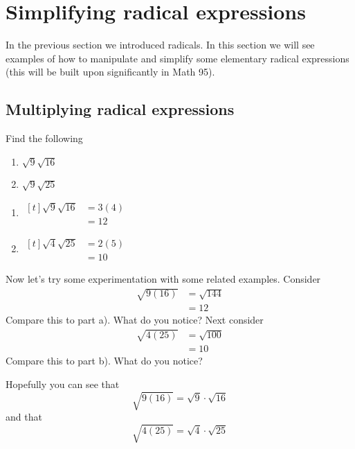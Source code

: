 \section{Simplifying radical expressions}
%
In the previous section we introduced radicals. In this section we will see examples of how to manipulate and
simplify some elementary radical expressions (this will be built upon significantly in Math 95). 

\subsection{Multiplying radical expressions}
\begin{myexample}
Find the following 
\begin{multicols}{2}
	\begin{enumerate}
		\item $\sqrt{9}\sqrt{16}$
		\item $\sqrt{9}\sqrt{25}$
	\end{enumerate} 
\end{multicols}
\end{myexample}
\begin{myProof}
	\begin{enumerate}
		\item 
		$\begin{aligned}[t]
			\sqrt{9}\sqrt{16} & =  3(4) \\
			                  & = 12    
		\end{aligned}$
		\item 
		$\begin{aligned}[t]
			\sqrt{4}\sqrt{25} & =  2(5) \\
			                  & = 10    
		\end{aligned}$
	\end{enumerate} 
\end{myProof} 
Now let's try some experimentation with some related examples. Consider
\begin{align*}
	\sqrt{9(16)} & =		\sqrt{144} \\
	             & =		12         
\end{align*} 
Compare this to part a). What do you notice? Next consider
\begin{align*}
	\sqrt{4(25)} & =		\sqrt{100} \\
	             & =		10         
\end{align*} 
Compare this to part b). What do you notice?

Hopefully you can see that
\[
	\sqrt{9(16)} = \sqrt{9}\cdot \sqrt{16}
\]
and that
\[
	\sqrt{4(25)} = \sqrt{4}\cdot\sqrt{25}
\]

